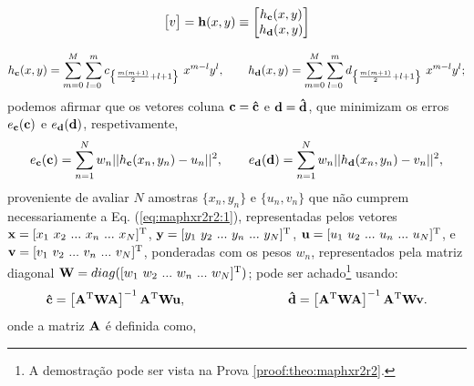 \begin{theorem}
\begin{minipage}{0.55\textwidth}
\begin{equation}
\begin{bmatrix}
v
\end{bmatrix} =
\VECTOR{h}(x,y) \equiv 
\begin{bmatrix}
h_{\VECTOR{c}}(x,y)\\
h_{\VECTOR{d}}(x,y)
\end{bmatrix}
\end{equation}
\end{minipage}
\begin{equation}\label{eq:maphxr2r2:1a}
h_{\VECTOR{c}}(x,y) = \sum \limits_{m=0}^{M} \sum \limits_{l=0}^{m}c_{\left\{ \frac{m(m+1)}{2}+l+1\right\}}~x^{m-l}y^{l}, 
\qquad
h_{\VECTOR{d}}(x,y) = \sum \limits_{m=0}^{M} \sum \limits_{l=0}^{m}d_{\left\{ \frac{m(m+1)}{2}+l+1\right\}}~x^{m-l}y^{l}; 
\end{equation}
podemos afirmar que os vetores coluna $\VECTOR{c}=\VECTOR{\hat{c}}$ e
$\VECTOR{d}=\VECTOR{\hat{d}}$,
que minimizam os erros $e_{\VECTOR{c}}(\VECTOR{c})$ e $e_{\VECTOR{d}}(\VECTOR{d})$,
respetivamente,
\begin{equation}\label{eq:maphxr2r2:2}
e_{\VECTOR{c}}(\VECTOR{c}) =  \sum_{n=1}^{N} w_n||h_{\VECTOR{c}}(x_n,y_n)-u_n||^2,\qquad 
e_{\VECTOR{d}}(\VECTOR{d}) =  \sum_{n=1}^{N} w_n||h_{\VECTOR{d}}(x_n,y_n)-v_n||^2,
\end{equation}
proveniente de avaliar $N$ amostras $\{x_n,y_n\}$ e $\{u_n,v_n\}$ 
que não cumprem necessariamente a Eq. (\ref{eq:maphxr2r2:1}), 
representadas pelos vetores 
$\VECTOR{x}=[x_1~ x_2~ ...~ x_n~ ...~ x_N]^{\transpose}$,
$\VECTOR{y}=[y_1~ y_2~ ...~ y_n~ ...~ y_N]^{\transpose}$, 
$\VECTOR{u}=[u_1~ u_2~ ...~ u_n~ ...~ u_N]^{\transpose}$, e
$\VECTOR{v}=[v_1~ v_2~ ...~ v_n~ ...~ v_N]^{\transpose}$,
ponderadas com os pesos $w_n$, 
representados pela matriz diagonal $\MATRIX{W}=\funcdiag([w_1~ w_2~ ...~ w_n~ ...~ w_N]^{\transpose})$;
pode ser achado\footnote{A demostração pode ser vista na Prova \ref{proof:theo:maphxr2r2}.} usando:
\begin{equation}\label{eq:maphxr2r2:3}
\VECTOR{\hat{c}}=
\left[ \MATRIX{A}^{\transpose} \MATRIX{W} \MATRIX{A} \right]^{-1}\MATRIX{A}^{\transpose} \MATRIX{W} \VECTOR{u},
\qquad \qquad \qquad \qquad
\VECTOR{\hat{d}}=
\left[ \MATRIX{A}^{\transpose} \MATRIX{W} \MATRIX{A} \right]^{-1}\MATRIX{A}^{\transpose} \MATRIX{W} \VECTOR{v}.
\end{equation}
onde a matriz $\MATRIX{A}$ é definida como,

\end{theorem}
